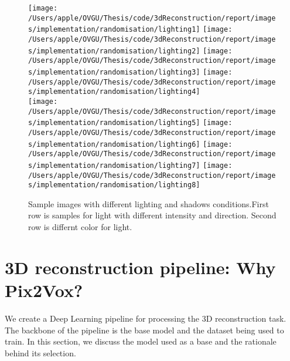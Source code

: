 \begin{figure}
    \centering
    \texttt{[image: /Users/apple/OVGU/Thesis/code/3dReconstruction/report/images/implementation/randomisation/lighting1]}
    \texttt{[image: /Users/apple/OVGU/Thesis/code/3dReconstruction/report/images/implementation/randomisation/lighting2]}
    \texttt{[image: /Users/apple/OVGU/Thesis/code/3dReconstruction/report/images/implementation/randomisation/lighting3]}
    \texttt{[image: /Users/apple/OVGU/Thesis/code/3dReconstruction/report/images/implementation/randomisation/lighting4]}\\
    \vspace{0.1cm}
    \texttt{[image: /Users/apple/OVGU/Thesis/code/3dReconstruction/report/images/implementation/randomisation/lighting5]}
    \texttt{[image: /Users/apple/OVGU/Thesis/code/3dReconstruction/report/images/implementation/randomisation/lighting6]}
    \texttt{[image: /Users/apple/OVGU/Thesis/code/3dReconstruction/report/images/implementation/randomisation/lighting7]}
    \texttt{[image: /Users/apple/OVGU/Thesis/code/3dReconstruction/report/images/implementation/randomisation/lighting8]}\\
    \caption{Sample images with different lighting and shadows conditions.First row is samples for light with different intensity and direction. Second row is differnt color for light.}
    \label{fig:Lighting and shadows}
\end{figure}

\section{3D reconstruction pipeline: Why Pix2Vox?}\label{sec:3D reconstruction pipeline}
We create a Deep Learning pipeline for processing the 3D reconstruction task.
The backbone of the pipeline is the base model and the dataset being used to train.
In this section, we discuss the model used as a base and the rationale behind its selection.

